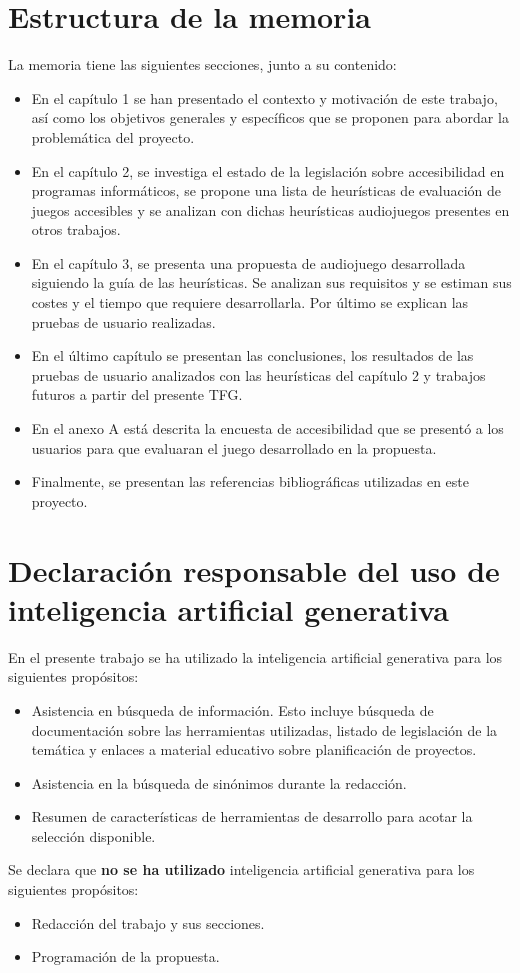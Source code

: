 \section{Estructura de la memoria}
La memoria tiene las siguientes secciones, junto a su contenido:
\begin{itemize}
	\item En el capítulo 1 se han presentado el contexto y motivación de este trabajo, así como los objetivos generales y específicos que se proponen para abordar la problemática del proyecto.
	\item En el capítulo 2, se investiga el estado de la legislación sobre accesibilidad en programas informáticos, se propone una lista de heurísticas de evaluación de juegos accesibles y se analizan con dichas heurísticas audiojuegos presentes en otros trabajos.
	\item En el capítulo 3, se presenta una propuesta de audiojuego desarrollada siguiendo la guía de las heurísticas. Se analizan sus requisitos y se estiman sus costes y el tiempo que requiere desarrollarla. Por último se explican las pruebas de usuario realizadas.
	\item En el último capítulo se presentan las conclusiones, los resultados de las pruebas de usuario analizados con las heurísticas del capítulo 2 y trabajos futuros a partir del presente TFG.
	\item En el anexo A está descrita la encuesta de accesibilidad que se presentó a los usuarios para que evaluaran el juego desarrollado en la propuesta.
	\item Finalmente, se presentan las referencias bibliográficas utilizadas en este proyecto.
\end{itemize}
\section{Declaración responsable del uso de inteligencia artificial generativa}
En el presente trabajo se ha utilizado la inteligencia artificial generativa para los siguientes propósitos:
\begin{itemize}
	\item Asistencia en búsqueda de información. Esto incluye búsqueda de documentación sobre las herramientas utilizadas, listado de legislación de la temática y enlaces a material educativo sobre planificación de proyectos.
	\item Asistencia en la búsqueda de sinónimos durante la redacción.
	\item Resumen de características de herramientas de desarrollo para acotar la selección disponible.
\end{itemize}
Se declara que \textbf{no se ha utilizado} inteligencia artificial generativa para los siguientes propósitos:
\begin{itemize}
	\item Redacción del trabajo y sus secciones.
	\item Programación de la propuesta.
\end{itemize}
